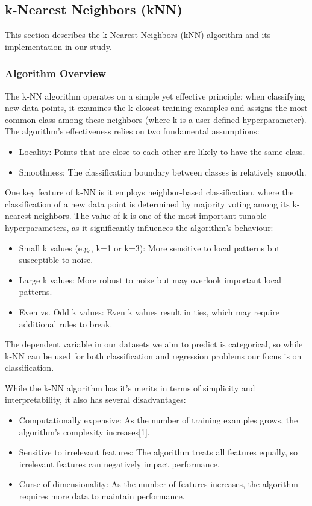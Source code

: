 \subsection{k-Nearest Neighbors (kNN)}
\label{subsec:methods-knn}

This section describes the k-Nearest Neighbors (kNN) algorithm and its implementation in our study.

\subsubsection{Algorithm Overview}

The k-NN algorithm operates on a simple yet effective principle: when classifying new data points, 
it examines the k closest training examples and assigns the most common class among these neighbors (where k is a user-defined hyperparameter). 
The algorithm's effectiveness relies on two fundamental assumptions:
\begin{itemize}
    \item Locality: Points that are close to each other are likely to have the same class.
    \item Smoothness: The classification boundary between classes is relatively smooth.
\end{itemize}

One key feature of k-NN is it employs neighbor-based classification, where the classification of a new data point 
is determined by majority voting among its k-nearest neighbors. 
The value of k is one of the most important tunable hyperparameters, as it significantly influences the algorithm's behaviour:
\begin{itemize}
    \item Small k values (e.g., k=1 or k=3): More sensitive to local patterns but susceptible to noise.
    \item Large k values: More robust to noise but may overlook important local patterns.
    \item Even vs. Odd k values: Even k values result in ties, which may require additional rules to break.
\end{itemize}

The dependent variable in our datasets we aim to predict is categorical, so while k-NN can be used for both classification and regression problems 
our focus is on classification.

While the k-NN algorithm has it's merits in terms of simplicity and interpretability, it also has several disadvantages:
\begin{itemize}
    \item Computationally expensive: As the number of training examples grows, the algorithm's complexity increases[1]. 
    \item Sensitive to irrelevant features: The algorithm treats all features equally, so irrelevant features can negatively impact performance.
    \item Curse of dimensionality: As the number of features increases, the algorithm requires more data to maintain performance.
\end{itemize}

